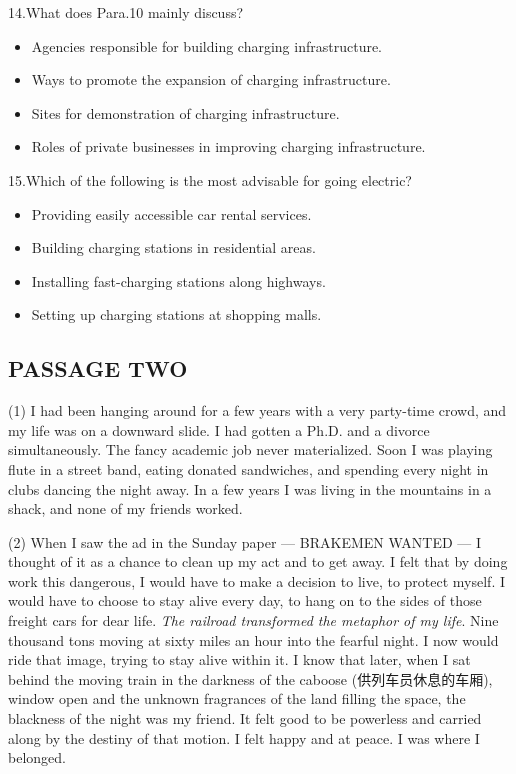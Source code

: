 \documentclass[UTF8,11pt]{ctexart}
\begin{document}
14.What does Para.10 mainly discuss?


\begin{itemize}[leftmargin=2em,itemsep=.2em,topsep=.4em]\item[A.] Agencies responsible for building charging infrastructure.
\item[B.] Ways to promote the expansion of charging infrastructure.
\item[C.] Sites for demonstration of charging infrastructure.
\item[D.] Roles of private businesses in improving charging infrastructure.
\end{itemize}

15.Which of the following is the most advisable for going electric?


\begin{itemize}[leftmargin=2em,itemsep=.2em,topsep=.4em]\item[A.] Providing easily accessible car rental services.
\item[B.] Building charging stations in residential areas.
\item[C.] Installing fast-charging stations along highways.
\item[D.] Setting up charging stations at shopping malls.
\end{itemize}

\subsection*{\textbf{PASSAGE TWO}}


(1) I had been hanging around for a few years with a very party-time crowd, and my life was on a downward slide. I had gotten a Ph.D. and a divorce simultaneously. The fancy academic job never materialized. Soon I was playing flute in a street band, eating donated sandwiches, and spending every night in clubs dancing the night away. In a few years I was living in the mountains in a shack, and none of my friends worked.


(2) When I saw the ad in the Sunday paper — BRAKEMEN WANTED — I thought of it as a chance to clean up my act and to get away. I felt that by doing work this dangerous, I would have to make a decision to live, to protect myself. I would have to choose to stay alive every day, to hang on to the sides of those freight cars for dear life. \textit{The railroad transformed the metaphor of my life}. Nine thousand tons moving at sixty miles an hour into the fearful night. I now would ride that image, trying to stay alive within it. I know that later, when I sat behind the moving train in the darkness of the caboose (供列车员休息的车厢), window open and the unknown fragrances of the land filling the space, the blackness of the night was my friend. It felt good to be powerless and carried along by the destiny of that motion. I felt happy and at peace. I was where I belonged.
\end{document}
